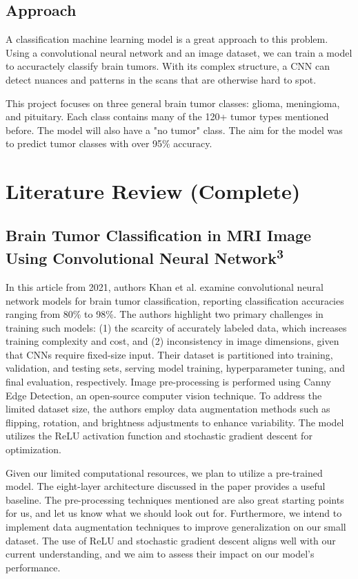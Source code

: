 \documentclass[conference]{IEEEtran}
\begin{document}
\subsection{\large Approach}

A classification machine learning model is a great approach to this problem. Using a convolutional neural network and an image dataset, we can train a model to accuractely classify brain tumors. With its complex structure, a CNN can detect nuances and patterns in the scans that are otherwise hard to spot. 

This project focuses on three general brain tumor classes: glioma, meningioma, and pituitary. Each class contains many of the 120+ tumor types mentioned before. The model will also have a "no tumor" class. The aim for the model was to predict tumor classes with over 95\% accuracy.

\section{\large Literature Review (Complete)}

\subsection{\large Brain Tumor Classification in MRI Image Using Convolutional Neural Network\textsuperscript{3}}

In this article from 2021, authors Khan et al. examine convolutional neural network models for brain tumor classification, reporting classification accuracies ranging from 80\% to 98\%. The authors highlight two primary challenges in training such models: (1) the scarcity of accurately labeled data, which increases training complexity and cost, and (2) inconsistency in image dimensions, given that CNNs require fixed-size input. Their dataset is partitioned into training, validation, and testing sets, serving model training, hyperparameter tuning, and final evaluation, respectively. Image pre-processing is performed using Canny Edge Detection, an open-source computer vision technique. To address the limited dataset size, the authors employ data augmentation methods such as flipping, rotation, and brightness adjustments to enhance variability. The model utilizes the ReLU activation function and stochastic gradient descent for optimization.

Given our limited computational resources, we plan to utilize a pre-trained model. The eight-layer architecture discussed in the paper provides a useful baseline. The pre-processing techniques mentioned are also great starting points for us, and let us know what we should look out for. Furthermore, we intend to implement data augmentation techniques to improve generalization on our small dataset. The use of ReLU and stochastic gradient descent aligns well with our current understanding, and we aim to assess their impact on our model's performance.
\end{document}
